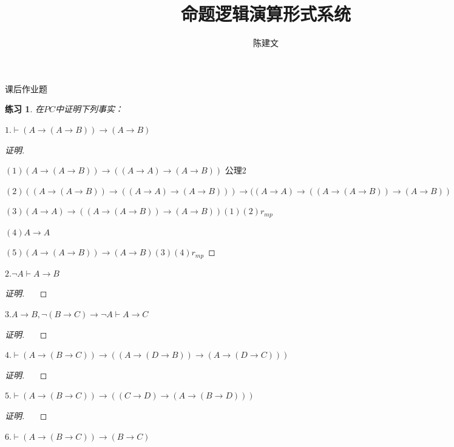 \documentclass{article}
\newtheorem{Exercise}{练习}
\begin{document}
\begin{CJK*}{UTF8}{gbsn}
  \title{命题逻辑演算形式系统}
  \author{陈建文}
  \maketitle

  课后作业题

  \begin{Exercise}
    在$PC$中证明下列事实：
  \end{Exercise}

  $1.\vdash (A\to(A\to B))\to (A\to B)$

\begin{proof}[证明]$\quad$
  
  $(1)(A\to(A\to B))\to ((A\to A)\to (A\to B))$ 公理2

  $(2)((A\to(A\to B))\to ((A\to A)\to (A\to B)))\to ((A\to A) \to ((A\to (A\to B))\to (A\to B))$

  $(3)(A\to A) \to ((A\to (A\to B))\to (A\to B))(1)(2)r_{mp}$

  $(4)A\to A$

  $(5)(A\to(A\to B))\to (A\to B) (3)(4)r_{mp}$


\end{proof}


$2.\lnot A\vdash A\to B$

\begin{proof}[证明]$\quad$
  



\end{proof}

$3.A\to B, \lnot(B\to C)\to \lnot A\vdash A\to C$

\begin{proof}[证明]$\quad$
  



\end{proof}

$4.\vdash (A\to (B\to C))\to ((A\to (D\to B))\to (A\to (D\to C)))$

\begin{proof}[证明]$\quad$
 


\end{proof}

$5.\vdash (A\to (B\to C))\to ((C\to D)\to (A\to (B\to D)))$

\begin{proof}[证明]$\quad$
  
 


\end{proof}
$6.\vdash (A\to (B\to C))\to (B\to C)$


\end{CJK*}
\end{document}
